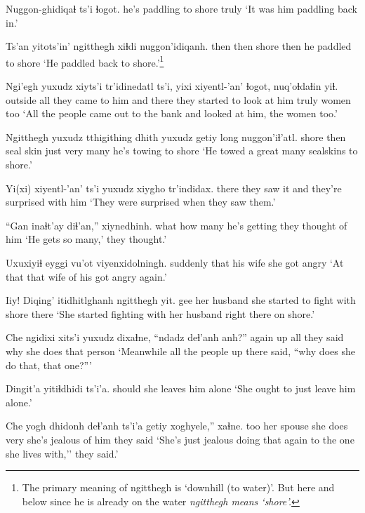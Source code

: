 \documentclass[12pt]{article}
\begin{document}
\gll Nuggon-ghidiqaɬ ts'i ɬogot. 
{he's paddling to shore} {} truly
\glt `It was him paddling back in.' 
\glend

\gll Ts'an yitots'in' ngitthegh xiɬdi nuggon'idiqanh. 
then   then    shore  then {he paddled to shore}
\glt `He paddled back to shore.'\footnote{The primary meaning of ngitthegh is `downhill (to water)'. But here and below since he is already on the water \em ngitthegh \em means `shore'.}
\glend

\gll Ngi'egh yuxudz {xiyts'i tr'idinedatl} ts'i, yixi {xiyentl-'an'} ɬogot, nuq'oɬdaɬin yiɬ. 
{outside} all  {they came to him} and there {they started to look at him} truly women too
\glt `All the people came out to the bank and looked at him, the women too.'  
\glend

\gll Ngitthegh yuxudz tthigithing dhith yuxudz getiy long nuggon'iɬ'atl. 
shore then seal skin just very many {he's towing to shore}
\glt `He towed a great many sealskins to shore.' 
\glend

\gll Yi(xi) xiyentl-'an' ts'i yuxudz {xiygho tr'indidax.} 
there {they saw it} and {} {they're surprised with him}
\glt `They were surprised when they saw them.' 
\glend

\gll ``Gan inaɬt'ay diɬ'an,'' xiynedhinh. 
what  {how many} {he's getting} {they thought of him}
\glt `He gets so many,' they thought.' 
\glend

\gll Uxuxiyiɬ eyggi vu'ot viyenxidolningh. 
suddenly that  {his wife} {she got angry}
\glt `At that that wife of his got angry again.' 
\glend

\gll Iiy! Diqing' itidhitlghanh ngitthegh yit.
gee {her husband} {she started to fight with} shore there 
\glt `She started fighting with her husband right there on shore.' 
\glend

\gll Che {ngidixi xits'i} yuxudz dixaɬne, ``ndadz deɬ'anh anh?'' 
again up all {they said} why {she does} {that person}
\glt `Meanwhile all the people up there said, ``why does she do that, that one?'''  
\glend

\gll Dingit'a yitiɬdhidi ts'i'a. 
should   {she leaves him alone} 
\glt `She ought to just leave him alone.' 
\glend

\gll Che {yogh dhidonh} deɬ'anh ts'i'a getiy xoghyele,'' xaɬne. 
too  {her spouse} {she does} {} very {she's jealous of him} {they said}
\glt `She's just jealous doing that again to the one she lives with,'' they said.' 
\glend
\end{document}
